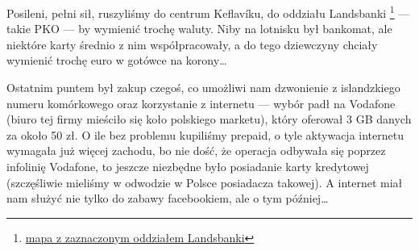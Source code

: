 

Posileni, pełni sił, ruszyliśmy do centrum Keflavíku, do oddziału Landsbanki \footnote{\href{https://www.google.com/url?q=https\%3A\%2F\%2Fmaps.google.com\%2Fmaps\%3Fq\%3D63.995522\%2C-22.548067}{mapa z zaznaczonym oddziałem Landsbanki}} --- takie PKO --- by wymienić trochę waluty. Niby na lotnisku był bankomat, ale niektóre karty średnio z nim współpracowały, a do tego dziewczyny chciały wymienić trochę euro w gotówce na korony…


Ostatnim puntem był zakup czegoś, co umożliwi nam dzwonienie z islandzkiego numeru komórkowego oraz korzystanie z internetu --- wybór padł na Vodafone (biuro tej firmy mieściło się koło polskiego marketu), który oferował 3 GB danych za około 50 zł. O ile bez problemu kupiliśmy prepaid, o tyle aktywacja internetu wymagała już więcej zachodu, bo nie dość, że operacja odbywała się poprzez infolinię Vodafone, to jeszcze niezbędne było posiadanie karty kredytowej (szczęśliwie mieliśmy w odwodzie w Polsce posiadacza takowej). A internet miał nam służyć nie tylko do zabawy facebookiem, ale o tym później…


